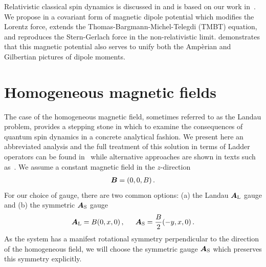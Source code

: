 Relativistic classical spin dynamics is discussed in  and is based on our work in~\cite{Rafelski:2017hce}. We propose in  a covariant form of magnetic dipole potential which modifies the Lorentz force, extends the Thomas-Bargmann-Michel-Telegdi (TMBT) equation, and reproduces the Stern-Gerlach force in the non-relativistic limit.  demonstrates that this magnetic potential also serves to unify both the Amp{\`e}rian and Gilbertian pictures of dipole moments.

\section{Homogeneous magnetic fields}
\label{sec:homogeneous}
\noindent The case of the homogeneous magnetic field, sometimes referred to as the Landau problem, provides a stepping stone in which to examine the consequences of quantum spin dynamics in a concrete analytical fashion. We present here an abbreviated analysis and the full treatment of this solution in terms of Ladder operators can be found in~\cite{Steinmetz:2018ryf} while alternative approaches are shown in texts such as~\cite{Itzykson:1980rh}. We assume a constant magnetic field in the $z$-direction
\begin{alignat}{1}
	\label{homogeneous:1} \boldsymbol{B}=(0,0,B)\,.
\end{alignat}
For our choice of gauge, there are two common options: (a) the Landau $\boldsymbol{A}_\mathrm{L}$ gauge and (b) the symmetric $\boldsymbol{A}_\mathrm{S}$ gauge
\begin{alignat}{1}
	\label{homogeneous:2} \bb{A}_\mathrm{L}=B(0,x,0)\,,\indent \bb{A}_\mathrm{S}=\frac{B}{2}(-y,x,0)\,.
\end{alignat}
As the system has a manifest rotational symmetry perpendicular to the direction of the homogeneous field, we will choose the symmetric gauge $\boldsymbol{A}_\mathrm{S}$ which preserves this symmetry explicitly.

